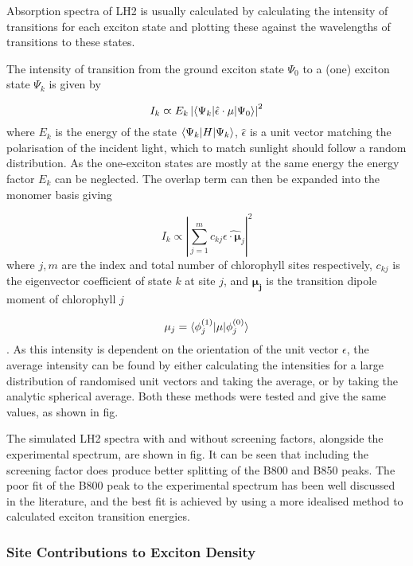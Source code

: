 Absorption spectra of LH2 is usually calculated by calculating the intensity of 
transitions for each exciton state and plotting these against the wavelengths of
transitions to these states. 

The intensity of transition from the ground exciton state $\Psi_0$ to a (one) exciton
state $\Psi_k$ is given by

\begin{equation}
    I_k \varpropto E_k \left\lvert \braket{\Psi_k| \hat{\epsilon} \cdot \mathbf{\mu} | \Psi_0} \right\rvert^2
\end{equation}
%
where $E_k$ is the energy of the state $\braket{\Psi_k|H|\Psi_k}$, $\hat{\epsilon}$
is a unit vector matching the polarisation of the incident light, which to match
sunlight should follow a random distribution. As the one-exciton states are mostly
at the same energy the energy factor $E_k$ can be neglected. The overlap term can
then be expanded into the monomer basis giving

\begin{equation}
    I_k \varpropto \left\lvert \sum^m_{j=1} c_{kj} \hat{\epsilon \cdot \mathbf{\mu}_j }\right\rvert^2
\end{equation}
%
where $j,m$ are the index and total number of chlorophyll sites respectively, $c_{kj}$
is the eigenvector coefficient of state $k$ at site $j$, and $\mathbf{\mu_j}$ is 
the transition dipole moment of chlorophyll $j$ 

\begin{equation}
    \mathbf{\mu}_j = \braket{\phi_j^{\left(1\right)}|\mathbf{\mu}|\phi_j^{\left(0\right)}}
\end{equation}
%
. As this intensity is dependent on the orientation of the unit vector $\epsilon$,
the average intensity can be found by either calculating the intensities for a large
distribution of randomised unit vectors and taking the average, or by taking the
analytic spherical average. Both these methods were tested and give the same values,
as shown in fig.

The simulated LH2 spectra with and without screening factors, alongside the experimental 
spectrum, are shown in fig. It can be seen that including the screening factor does 
produce better splitting of the B800 and B850 peaks. The poor fit of the B800 peak 
to the experimental spectrum has been well discussed in the literature, and the best
fit is achieved by using a more idealised method to calculated exciton transition
energies.

\subsubsection{Site Contributions to Exciton Density}
\label{subsubsec:site_dens}

